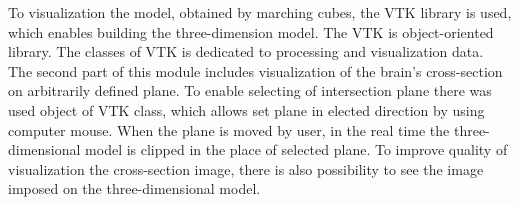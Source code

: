 \indent To visualization the model, obtained by marching cubes, the
VTK library is used, which enables building the three-dimension model.
The VTK is object-oriented library. The classes of VTK is dedicated to processing and visualization data.\cite{11_vtk}
\\
 \indent The second part of this module includes visualization of the brain’s cross-section on arbitrarily defined plane. To enable selecting of intersection plane there was used object of VTK class, which allows set plane in elected direction by using computer mouse. When the plane is moved by user, in the real time the  three-dimensional model is clipped in the place of selected plane. To improve quality of visualization the cross-section image, there is also possibility to see the image imposed on the three-dimensional model. \\

